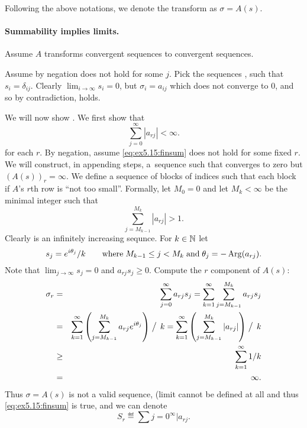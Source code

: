 \begin{enumerate}
Following the above notations, we denote the transform as \(\sigma = A(s)\).

\paragraph{Summability implies limits.}
Assume $A$ transforms convergent sequences to convergent sequences.

Assume by negation  does not hold for some $j$.
Pick the sequences , such that \(s_{i} = \delta_{ij}\).
Clearly \(\lim_{i\to\infty}s_i = 0\), 
but \(\sigma_i = a_{ij}\) which does not converge to $0$, 
and so by contradiction,  holds.

We will now show . We first show that 
\begin{equation} \label{eq:ex5.15:finsum}
\sum_{j=0}^\infty |a_{rj}| < \infty.
\end{equation}
for each $r$. By negation, assume \eqref{eq:ex5.15:finsum} does not hold 
for some fixed $r$.
We will construct, in appending steps, 
a~sequence  such that converges to zero but
\((A(s))_r = \infty\).
We define a sequence of blocks of indices such that 
each block if $A$'s $r$th row is ``not too small''.
Formally, let \(M_0 = 0\) and let \(M_k<\infty\) be the minimal integer
such that \[\sum_{j=M_{k-1}}^{M_k} |a_{rj}| > 1.\]
Clearly  is an infinitely increasing sequnce.
For \(k\in\mathbb{N}\) let 
\[s_j = e^{i\theta_j}/k \qquad 
 \textrm{where}\;
 M_{k-1} \leq j < M_k
 \;\textrm{and}\;
 \theta_j = -\mathop{\rm Arg}\nolimits(a_{rj}).\]
Note that \(\lim_{j\to\infty}s_j = 0\) and \(a_{rj}s_j \geq 0\).
Compute the $r$ component of \(A(s)\):
\begin{eqnarray*}
\sigma_r 
&=& \sum_{j=0}^\infty a_{rj}s_j 
 = \sum_{k=1}^\infty \sum_{j=M_{k-1}}^{M_k} a_{rj}s_j \\
&=& \sum_{k=1}^\infty 
      \left(\sum_{j=M_{k-1}}^{M_k} a_{rj}e^{i\theta_j}\right) \bigm/\,k 
 = \sum_{k=1}^\infty \left(\sum_{j=M_{k-1}}^{M_k} |a_{rj}|\right) \bigm/\,k \\
&\geq& \sum_{k=1}^\infty 1/k \\
&=& \infty.
\end{eqnarray*}
Thus \(\sigma=A(s)\) is not a valid sequence, (limit cannot be defined at all
and thus \eqref{eq:ex5.15:finsum} is true, and we can denote
\[S_r \eqdef \sum{j=0}^\infty |a_{rj}.\]



\end{enumerate}
